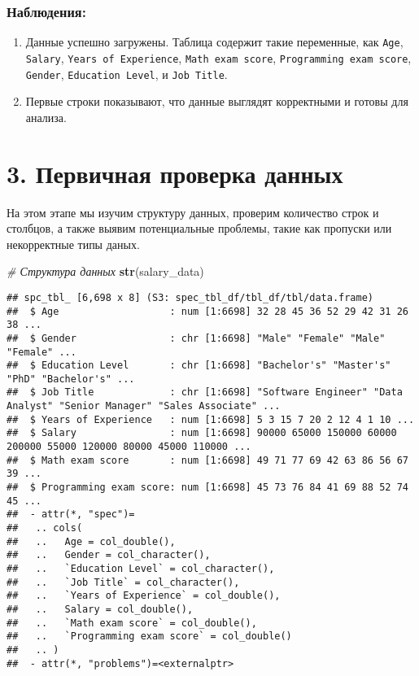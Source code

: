 \documentclass[
]{article}
\newenvironment{Shaded}{\begin{snugshade}}{\end{snugshade}}
\newcommand{\CommentTok}[1]{\textcolor[rgb]{0.56,0.35,0.01}{\textit{#1}}}
\newcommand{\FunctionTok}[1]{\textcolor[rgb]{0.13,0.29,0.53}{\textbf{#1}}}
\newcommand{\NormalTok}[1]{#1}
\providecommand{\tightlist}{%
  \setlength{\itemsep}{0pt}\setlength{\parskip}{0pt}}
\begin{document}
\subsubsection{Наблюдения:}\label{ux43dux430ux431ux43bux44eux434ux435ux43dux438ux44f}

\begin{enumerate}
\def\labelenumi{\arabic{enumi}.}
\tightlist
\item
  Данные успешно загружены. Таблица содержит такие переменные, как
  \texttt{Age}, \texttt{Salary}, \texttt{Years\ of\ Experience},
  \texttt{Math\ exam\ score}, \texttt{Programming\ exam\ score},
  \texttt{Gender}, \texttt{Education\ Level}, и \texttt{Job\ Title}.
\item
  Первые строки показывают, что данные выглядят корректными и готовы для
  анализа.
\end{enumerate}

\section{3. Первичная проверка
данных}\label{ux43fux435ux440ux432ux438ux447ux43dux430ux44f-ux43fux440ux43eux432ux435ux440ux43aux430-ux434ux430ux43dux43dux44bux445}

На этом этапе мы изучим структуру данных, проверим количество строк и
столбцов, а также выявим потенциальные проблемы, такие как пропуски или
некорректные типы даных.

\begin{Shaded}
\begin{Highlighting}[]
\CommentTok{\# Структура данных}
\FunctionTok{str}\NormalTok{(salary\_data)}
\end{Highlighting}
\end{Shaded}

\begin{verbatim}
## spc_tbl_ [6,698 x 8] (S3: spec_tbl_df/tbl_df/tbl/data.frame)
##  $ Age                   : num [1:6698] 32 28 45 36 52 29 42 31 26 38 ...
##  $ Gender                : chr [1:6698] "Male" "Female" "Male" "Female" ...
##  $ Education Level       : chr [1:6698] "Bachelor's" "Master's" "PhD" "Bachelor's" ...
##  $ Job Title             : chr [1:6698] "Software Engineer" "Data Analyst" "Senior Manager" "Sales Associate" ...
##  $ Years of Experience   : num [1:6698] 5 3 15 7 20 2 12 4 1 10 ...
##  $ Salary                : num [1:6698] 90000 65000 150000 60000 200000 55000 120000 80000 45000 110000 ...
##  $ Math exam score       : num [1:6698] 49 71 77 69 42 63 86 56 67 39 ...
##  $ Programming exam score: num [1:6698] 45 73 76 84 41 69 88 52 74 45 ...
##  - attr(*, "spec")=
##   .. cols(
##   ..   Age = col_double(),
##   ..   Gender = col_character(),
##   ..   `Education Level` = col_character(),
##   ..   `Job Title` = col_character(),
##   ..   `Years of Experience` = col_double(),
##   ..   Salary = col_double(),
##   ..   `Math exam score` = col_double(),
##   ..   `Programming exam score` = col_double()
##   .. )
##  - attr(*, "problems")=<externalptr>
\end{verbatim}
\end{document}
